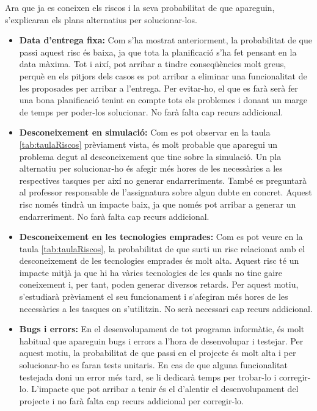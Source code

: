 \documentclass[a4paper]{article}
\begin{document}
Ara que ja es coneixen els riscos i la seva probabilitat de que apareguin, s'explicaran els plans alternatius per solucionar-los.
\begin{itemize}
    \item \textbf{Data d'entrega fixa:} Com s'ha mostrat anteriorment, la probabilitat de que passi aquest risc és baixa, ja que tota la planificació s'ha fet pensant en la data màxima. Tot i així, pot arribar a tindre conseqüències molt greus, perquè en els pitjors dels casos es pot arribar a eliminar una funcionalitat de les proposades per arribar a l'entrega. Per evitar-ho, el que es farà serà fer una bona planificació tenint en compte tots els problemes i donant un marge de temps per poder-los solucionar. No farà falta cap recurs addicional.
    \item \textbf{Desconeixement en simulació:} Com es pot observar en la taula \ref{tab:taulaRiscos} prèviament vista, és molt probable que aparegui un problema degut al desconeixement que tinc sobre la simulació. Un pla alternatiu per solucionar-ho és afegir més hores de les necessàries a les respectives tasques per així no generar endarreriments. També es preguntarà al professor responsable de l'assignatura sobre algun dubte en concret. Aquest risc només tindrà un impacte baix, ja que només pot arribar a generar un endarreriment. No farà falta cap recurs addicional.
    \item \textbf{Desconeixement en les tecnologies emprades:} Com es pot veure en la taula \ref{tab:taulaRiscos}, la probabilitat de que surti un risc relacionat amb el desconeixement de les tecnologies emprades és molt alta. Aquest risc té un impacte mitjà ja que hi ha vàries tecnologies de les quals no tinc gaire coneixement i, per tant, poden generar diversos retards.  Per aquest motiu, s'estudiarà prèviament el seu funcionament i s'afegiran més hores de les necessàries a les tasques on s'utilitzin. No serà necessari cap recurs addicional.
    \item \textbf{Bugs i errors:} En el desenvolupament de tot programa informàtic, és molt habitual que apareguin bugs i errors a l'hora de desenvolupar i testejar. Per aquest motiu, la probabilitat de que passi en el projecte és molt alta i per solucionar-ho es faran tests unitaris. En cas de que alguna funcionalitat testejada doni un error més tard, se li dedicarà temps per trobar-lo i corregir-lo. L'impacte que pot arribar a tenir és el d'alentir el desenvolupament del projecte i no farà falta cap recurs addicional per corregir-lo.
\end{itemize}
\end{document}
